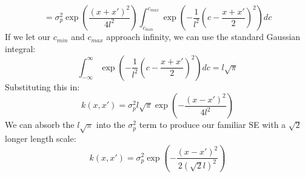 \begin{equation*}
    = \sigma_p^2 \exp \left( \frac{(x + x')^2}{4l^2} \right) \int_{c_{min}}^{c_{max}} \exp \left( -\frac{1}{l^2} (c - \frac{x + x'}{2})^2 \right) dc
\end{equation*}
If we let our $c_{min}$ and $c_{max}$ approach infinity, we can use the standard Gaussian integral:
\begin{equation*}
    \int_{-\infty}^{\infty} \exp \left( -\frac{1}{l^2} (c - \frac{x + x'}{2})^2 \right) dc = l\sqrt{\pi}
\end{equation*}
Substituting this in:
\begin{equation*}
    k(x, x') = \sigma_p^2 l\sqrt{\pi} \exp \left( -\frac{(x - x')^2}{4l^2} \right)
\end{equation*}
We can absorb the $l\sqrt{\pi}$ into the $\sigma_p^2$ term to produce our familiar SE with a $\sqrt{2}$ longer length scale:
\begin{equation} \label{eq:feature-space-se}
    k(x, x') = \sigma^2_p \exp \left( -\frac{(x - x')^2}{2(\sqrt{2}l)^2} \right)
\end{equation}

% 


